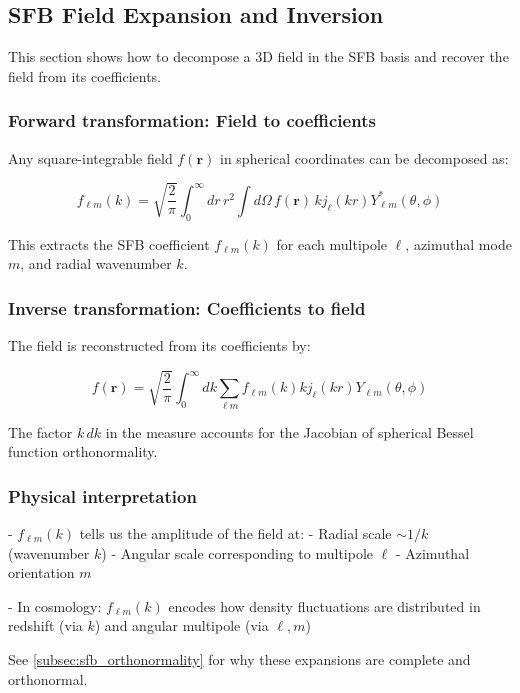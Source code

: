 \subsection{SFB Field Expansion and Inversion}\label{subsec:sfb_expansion}

This section shows how to decompose a 3D field in the SFB basis and recover the field from its coefficients.

\subsubsection{Forward transformation: Field to coefficients}

Any square-integrable field $f(\mathbf{r})$ in spherical coordinates can be decomposed as:

\begin{equation}
f_{\ell m}(k) = \sqrt{\frac{2}{\pi}} \int_0^\infty dr \, r^2 \int d\Omega \, f(\mathbf{r}) \, k j_\ell(kr) Y^*_{\ell m}(\theta, \phi)
\label{eq:sfb_analysis}
\end{equation}

This extracts the SFB coefficient $f_{\ell m}(k)$ for each multipole $\ell$, azimuthal mode $m$, and radial wavenumber $k$.

\subsubsection{Inverse transformation: Coefficients to field}

The field is reconstructed from its coefficients by:

\begin{equation}
f(\mathbf{r}) = \sqrt{\frac{2}{\pi}} \int_0^\infty dk \sum_{\ell m} f_{\ell m}(k) k j_\ell(kr) Y_{\ell m}(\theta, \phi)
\label{eq:sfb_synthesis}
\end{equation}

The factor $k \, dk$ in the measure accounts for the Jacobian of spherical Bessel function orthonormality.

\subsubsection{Physical interpretation}

- $f_{\ell m}(k)$ tells us the amplitude of the field at:
  - Radial scale $\sim 1/k$ (wavenumber $k$)
  - Angular scale corresponding to multipole $\ell$
  - Azimuthal orientation $m$
  
- In cosmology: $f_{\ell m}(k)$ encodes how density fluctuations are distributed in redshift (via $k$) and angular multipole (via $\ell, m$)

See \cref{subsec:sfb_orthonormality} for why these expansions are complete and orthonormal.
